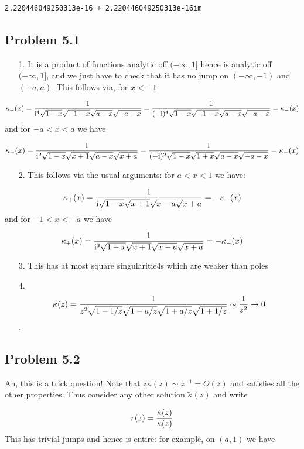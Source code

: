 \documentclass[12pt,a4paper]{article}
\def\I{ {\rm i} }
\begin{document}
\begin{lstlisting}
2.220446049250313e-16 + 2.220446049250313e-16im
\end{lstlisting}


\subsection{Problem 5.1}
\begin{itemize}
\item[1. ] It is a product of functions analytic off $(-\infty,1]$ hence is analytic off $(-\infty,1]$, and we just have to check that it has no jump on $(-\infty,-1)$ and $(-a,a)$. This follows via, for $x < -1$:

\end{itemize}
\[
\kappa_+(x) = {1 \over \I^4 \sqrt{1-x}\sqrt{-1-x}\sqrt{a-x}\sqrt{-a-x}} = {1 \over (-\I)^4 \sqrt{1-x}\sqrt{-1-x}\sqrt{a-x}\sqrt{-a-x}} = \kappa_-(x)
\]
and for $-a < x < a$ we have

\[
\kappa_+(x) = {1 \over \I^2 \sqrt{1-x}\sqrt{x+1}\sqrt{a-x}\sqrt{x+a}} = {1 \over (-\I)^2 \sqrt{1-x}\sqrt{1+x}\sqrt{a-x}\sqrt{-a-x}} = \kappa_-(x)
\]
\begin{itemize}
\item[2. ] This follows via the usual arguments: for $a < x < 1$ we have:

\end{itemize}
\[
\kappa_+(x) = {1 \over \I \sqrt{1-x}\sqrt{x+1}\sqrt{x-a}\sqrt{x+a}} =  -\kappa_-(x)
\]
and for $-1 < x < -a$ we have

\[
\kappa_+(x) = {1 \over \I^3 \sqrt{1-x}\sqrt{x+1}\sqrt{x-a}\sqrt{x+a}} =  -\kappa_-(x)
\]
\begin{itemize}
\item[3. ] This has at most square singularitie4s which are weaker than poles


\item[4. ] \[
\kappa(z) = {1 \over z^2 \sqrt{1-1/z}\sqrt{1-a/z} \sqrt{1+a/z} \sqrt{1+1/z}} \sim {1 \over z^2} \rightarrow 0
\]
. 

\end{itemize}
\subsection{Problem 5.2}
Ah, this is a trick question! Note that $z \kappa(z) \sim z^{-1} = O(z)$ and satisfies all the other properties. Thus consider any other solution $\tilde \kappa(z)$ and write

\[
r(z) = {\tilde \kappa(z) \over \kappa(z) }
\]
This has trivial jumps and hence is entire: for example, on $(a,1)$ we have
\end{document}
